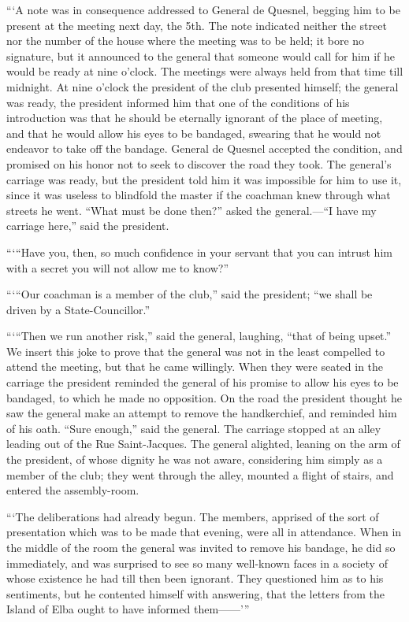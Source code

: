 “‘A note was in consequence addressed to General de Quesnel, begging
him to be present at the meeting next day, the 5th. The note indicated
neither the street nor the number of the house where the meeting was to
be held; it bore no signature, but it announced to the general that
someone would call for him if he would be ready at nine o’clock. The
meetings were always held from that time till midnight. At nine o’clock
the president of the club presented himself; the general was ready, the
president informed him that one of the conditions of his introduction
was that he should be eternally ignorant of the place of meeting, and
that he would allow his eyes to be bandaged, swearing that he would not
endeavor to take off the bandage. General de Quesnel accepted the
condition, and promised on his honor not to seek to discover the road
they took. The general’s carriage was ready, but the president told him
it was impossible for him to use it, since it was useless to blindfold
the master if the coachman knew through what streets he went. “What
must be done then?” asked the general.—“I have my carriage here,” said
the president.

“‘“Have you, then, so much confidence in your servant that you can
intrust him with a secret you will not allow me to know?”

“‘“Our coachman is a member of the club,” said the president; “we shall
be driven by a State-Councillor.”

“‘“Then we run another risk,” said the general, laughing, “that of
being upset.” We insert this joke to prove that the general was not in
the least compelled to attend the meeting, but that he came willingly.
When they were seated in the carriage the president reminded the
general of his promise to allow his eyes to be bandaged, to which he
made no opposition. On the road the president thought he saw the
general make an attempt to remove the handkerchief, and reminded him of
his oath. “Sure enough,” said the general. The carriage stopped at an
alley leading out of the Rue Saint-Jacques. The general alighted,
leaning on the arm of the president, of whose dignity he was not aware,
considering him simply as a member of the club; they went through the
alley, mounted a flight of stairs, and entered the assembly-room.

“‘The deliberations had already begun. The members, apprised of the
sort of presentation which was to be made that evening, were all in
attendance. When in the middle of the room the general was invited to
remove his bandage, he did so immediately, and was surprised to see so
many well-known faces in a society of whose existence he had till then
been ignorant. They questioned him as to his sentiments, but he
contented himself with answering, that the letters from the Island of
Elba ought to have informed them——’”

